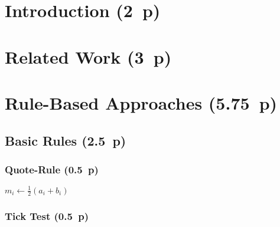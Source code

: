 \section{Introduction (2~p)}\label{introduction}

\section{Related Work (3~p)}\label{related-work}

\section{Rule-Based Approaches (5.75~p)}\label{rule-based-approaches}

\subsection{Basic Rules (2.5~p)}\label{basic-rules}

\subsubsection{Quote-Rule (0.5~p)}\label{quote-rule}

\begin{algorithm}


  \caption{$\operatorname{\mathtt{quote}}$ \label{alg:quote-rule}}


  \BlankLine %

  $m_i \leftarrow \frac{1}{2}(a_i + b_i)$ 

  \uElse{%
    \Return
  }
\end{algorithm}




\subsubsection{Tick Test (0.5~p)}\label{tick-test}



